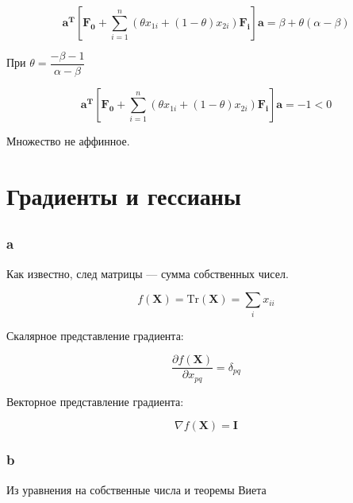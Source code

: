 	\begin{equation}
	\mathbf{a^T} \left[ \mathbf{F_0} + \sum\limits_{i=1}^{n}(\theta x_{1i} + (1-\theta) x_{2i} )\mathbf{F_i} \right] \mathbf{a}= \beta + \theta (\alpha - \beta)
	\end{equation}
	
	При $\theta = \dfrac{-\beta - 1}{\alpha - \beta}$
	
	\begin{equation}
	\mathbf{a^T} \left[ \mathbf{F_0} + \sum\limits_{i=1}^{n}(\theta x_{1i} + (1-\theta) x_{2i} )\mathbf{F_i} \right] \mathbf{a} = -1 < 0
	\end{equation}
	
	Множество не аффинное.
	
	\section{Градиенты и гессианы}
	
	\subsection{}
	
	\subsubsection{a}
	
	Как известно, след матрицы --- сумма собственных чисел.
	
	\begin{equation}
	f(\mathbf{X}) = \text{Tr} (\mathbf{X}) = \sum_i x_{ii}
	\end{equation}
	
	Скалярное представление градиента:
	
	\begin{equation}
	\frac{\partial f(\mathbf{X}) }{\partial x_{pq}}  = \delta_{pq} 
	\end{equation}
	
	Векторное представление градиента:
	
	\begin{equation}
	\nabla f(\mathbf{X}) = \mathbf{I}
	\end{equation}
	
	\subsubsection{b}
	
	Из уравнения на собственные числа и теоремы Виета
	
